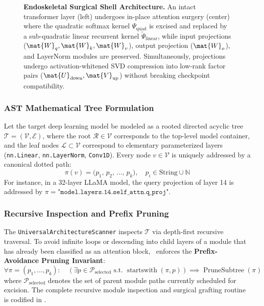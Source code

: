 \begin{figure}[t]
{\begin{tikzpicture}
\end{tikzpicture}%
}
\caption[Endoskeletal Surgical Shell Architecture]{\textbf{Endoskeletal Surgical Shell Architecture.} An intact transformer layer (left) undergoes in-place attention surgery (center) where the quadratic softmax kernel $\Psi_{\text{quad}}$ is excised and replaced by a sub-quadratic linear recurrent kernel $\widetilde{\Psi}_{\text{linear}}$, while input projections ($\mat{W}_q, \mat{W}_k, \mat{W}_v$), output projection ($\mat{W}_o$), and LayerNorm modules are preserved. Simultaneously, projections undergo activation-whitened SVD compression into low-rank factor pairs ($\mat{U}_{\text{down}}, \mat{V}_{\text{up}}$) without breaking checkpoint compatibility.}
\label{fig:surgical_shell_ast}
\end{figure}

\subsubsection{AST Mathematical Tree Formulation}
Let the target deep learning model be modeled as a rooted directed acyclic tree $\mathcal{T} = (\mathcal{V}, \mathcal{E})$, where the root $\mathcal{R} \in \mathcal{V}$ corresponds to the top-level model container, and the leaf nodes $\mathcal{L} \subset \mathcal{V}$ correspond to elementary parameterized layers (\texttt{nn.Linear}, \texttt{nn.LayerNorm}, \texttt{Conv1D}). Every node $v \in \mathcal{V}$ is uniquely addressed by a canonical dotted path:
\begin{equation}
    \pi(v) = \big(p_1, \, p_2, \, \dots, \, p_k\big), \quad p_i \in \text{String} \cup \mathbb{N}
    \label{eq:dotted_path}
\end{equation}
For instance, in a 32-layer LLaMA model, the query projection of layer 14 is addressed by $\pi = \texttt{"model.layers.14.self\_attn.q\_proj"}$.

\subsubsection{Recursive Inspection and Prefix Pruning}
The \texttt{UniversalArchitectureScanner} inspects $\mathcal{T}$ via depth-first recursive traversal. To avoid infinite loops or descending into child layers of a module that has already been classified as an attention block, \neuralops\ enforces the \textbf{Prefix-Avoidance Pruning Invariant}:
\begin{equation}
    \forall \pi = (p_1, \dots, p_k): \quad \left( \exists p \in \mathcal{P}_{\text{selected}} \text{ s.t. } \operatorname{startswith}(\pi, p) \right) \implies \operatorname{PruneSubtree}(\pi)
    \label{eq:prefix_pruning}
\end{equation}
where $\mathcal{P}_{\text{selected}}$ denotes the set of parent module paths currently scheduled for excision. The complete recursive module inspection and surgical grafting routine is codified in .

